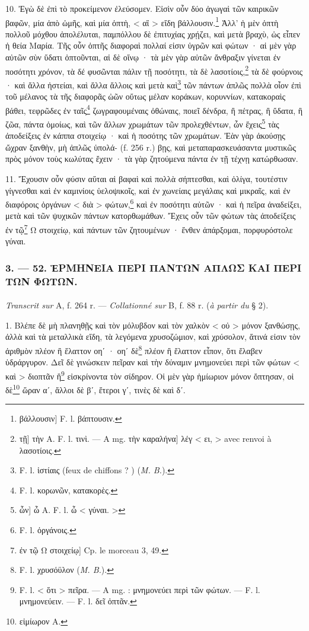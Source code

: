 \documentclass[landscape, a4paper, 11pt, oneside, polutonikogreek, french]{article}
\begin{document}
10. Ἐγὼ δὲ ἐπὶ τὸ προκείμενον ἐλεύσομεν. Εἰσὶν οὖν δύο ἀγωγαὶ τῶν καιρικῶν βαφῶν, μία ἀπὸ ὠμῆς, καὶ μία ὀπτὴ, < αἳ > εἴδη βάλλουσιν.\footnote{βάλλουσιν] F. l. βάπτουσιν.} Ἀλλ' ἡ μὲν ὀπτὴ πολλοῦ μόχθου ἀπολέλυται, παμπόλλου δὲ ἐπιτυχίας χρῄζει, καὶ μετὰ βραχὺ, ὡς εἶπεν ἡ θεία Μαρία. Τῆς οὖν ὀπτῆς διαφοραὶ πολλαί εἰσιν ὑγρῶν καὶ φώτων · αἱ μὲν γὰρ αὐτῶν σὺν ὕδατι ὀπτοῦνται, αἱ δὲ οἴνῳ · τὰ μὲν γὰρ αὐτῶν ἄνθραξιν γίνεται ἐν ποσότητι χρόνον, τὰ δέ φυσῶνται πάλιν τῇ ποσότητι, τὰ δὲ λασοτίοις,\footnote{τῇ] τὴν A. F. l. τινὶ. --- A mg. τὴν καραλήνα] λέγ < ει, > avec renvoi à λασοτίοις.} τὰ δὲ φούρνοις · καὶ ἄλλα ἠστείαι, καὶ ἄλλα ἄλλοις καὶ μετὰ καὶ\footnote{F. l. ἱστίαις (feux de chiffons ? ) (\emph{M. B.}).} τῶν πάντων ἁπλῶς πολλὰ οἶον ἐπὶ τοῦ μέλανος τὰ τῆς διαφορᾶς ὠῶν οὕτως μέλαν κοράκων, κορυννίων, κατακοραὶς βάθει, τεφρῶδες ἐν ταῖς\footnote{F. l. κορωνῶν, κατακορὲς.} ζωγραφουμέναις ὀθώναις, ποιεῖ δένδρα, ἢ πέτρας, ἢ ὕδατα, ἢ ζῶα, πάντα ὁμοίως, καὶ τῶν ἄλλων χρωμάτων τῶν προλεχθέντων, ὧν ἔχεις\footnote{ ὧν] ὦ A. F. l. ὦ < γύναι. >} τὰς ἀποδείξεις ἐν κάππα στοιχείῳ · καὶ ἡ ποσότης τῶν χρωμάτων. Ἐὰν γὰρ ἀκούσῃς ὤχραν ξανθὴν, μὴ ἀπλῶς ὑπολά- (f. 256 r.) βῃς, καὶ μεταπαρασκευάσαντα μυστικῶς πρὸς μόνον τοὺς κωλύτας ἔχειν · τὰ γὰρ ζητούμενα πάντα ἐν τῇ τέχνῃ κατώρθωσαν.

11. Ἔχουσιν οὖν φύσιν αὕται αἱ βαφαὶ καὶ πολλὰ σήπτεσθαι, καὶ ὀλίγα, τουτέστιν γίγνεσθαι καὶ ἐν καμινίοις ὑελοψικοῖς, καὶ ἐν χωνείαις μεγάλαις καὶ μικραῖς, καὶ ἐν διαφόροις ὀργάνων < διὰ > φώτων,\footnote{F. l. ὀργάνοις.} καὶ ἐν ποσότητι αὐτῶν · καὶ ἡ πεῖρα ἀναδείξει, μετὰ καὶ τῶν ψυχικῶν πάντων κατορθωμάθων. Ἔχεις οὖν τῶν φώτων τὰς ἀποδείξεις ἐν τῷ\footnote{ἐν τῷ Ω στοιχείῳ] Cp. le morceau 3, 49.} Ω στοιχείῳ, καὶ πάντων τῶν ζητουμένων · ἔνθεν ἀπάρξομαι, πορφυρόστολε γύναι.

\bigskip
\centerline{\EightStarTaper}
\centerline{\EightStarTaper\EightStarTaper}
\bigskip

\subsubsection{3. --- 52. ἙΡΜΗΝΕΙΑ ΠΕΡΙ ΠΑΝΤΩΝ ΑΠΛΩΣ ΚΑΙ ΠΕΡΙ ΤΩΝ ΦΩΤΩΝ.}
\paragraph{}
\emph{Transcrit sur} A, f. 264 r. --- \emph{Collationné sur} B, f. 88 r. (\emph{à partir du} § 2).

\bigskip

1. Βλέπε δὲ μὴ πλανηθῇς καὶ τὸν μόλυβδον καὶ τὸν χαλκὸν < οὐ > μόνον ξανθώσῃς, ἀλλὰ καὶ τὰ μεταλλικὰ εἴδη, τὰ λεγόμενα χρυσοζώμιον, καὶ χρύσολον, ἅτινά εἰσιν τὸν ἀριθμὸν πλέον ἢ ἔλαττον οηʹ · οηʹ δὲ\footnote{F. l. χρυσόϋλον (\emph{M. B.}).} πλέον ἢ ἔλαττον εἶπον, ὅτι ἔλαβεν ὑδράργυρον. Δεῖ δὲ γινώσκειν πεῖραν καὶ τὴν δύναμιν μνημονεύει περὶ τῶν φώτων < καὶ > διοπτᾶν ἢ\footnote{F. l. < ὅτι > πεῖρα. --- A mg. : μνημονεύει περὶ τῶν φώτων. --- F. l. μνημονεύειν. --- F. l. δεῖ ὀπτᾶν.} εἰσκρίνοντα τὸν σίδηρον. Οἱ μὲν γὰρ ἡμίωριον μόνον ὄπτησαν, οἱ δὲ\footnote{εἰμίωρον A.} ὥραν αʹ, ἄλλοι δὲ βʹ, ἕτεροι γʹ, τινὲς δὲ καὶ δʹ.
\end{document}
